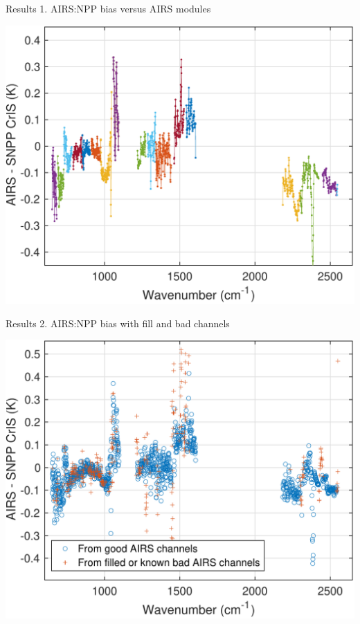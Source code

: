 \documentclass[10pt,t]{beamer}
\begin{document}
\begin{frame}{Results 1. AIRS:NPP bias versus AIRS modules}

\vspace{-0.1in}
  \begin{center}
    \includegraphics[width=0.7\linewidth]{./Strow/airs_minus_cris_airs_array_colors.pdf}
\end{center}
  \end{frame}

\begin{frame}{Results 2. AIRS:NPP bias with fill and bad channels}

\vspace{-0.1in}
  \begin{center}
   \includegraphics[width=0.7\linewidth]{./Strow/lls_2018_airs_npp_ac1_stats_bias_wbad_fill_v2.pdf}
  \end{center}
    
\end{frame}
\end{document}

